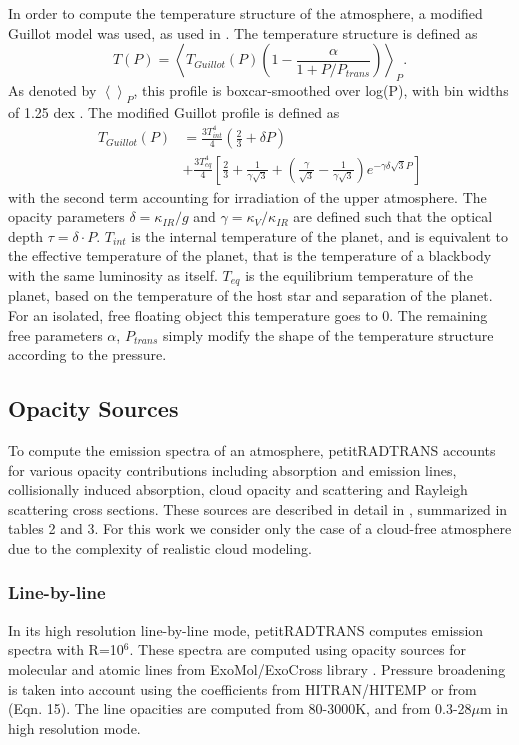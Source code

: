 In order to compute the temperature structure of the atmosphere, a modified Guillot model \parencite{Guillot2010} was used, as used in \parencite{Molliere2017,Molliere2019}.
The temperature structure is defined as 
\begin{equation}
T(P) = \left<T_{Guillot}(P)\left(1-\frac{\alpha}{1+P/P_{trans}}\right)\right>_{P}.
\end{equation}
As denoted by $\left<\right>_{P}$, this profile is boxcar-smoothed over log(P), with bin widths of 1.25 dex \parencite{Molliere2019}. 
The modified Guillot profile is defined as
\begin{align}
T_{Guillot}(P) &= \frac{3T^{4}_{int}}{4}\left(\frac{2}{3} + \delta P\right)\\
&+\frac{3T^{4}_{eq}}{4}\left[\frac{2}{3} + \frac{1}{\gamma\sqrt{3}} + \left(\frac{\gamma}{\sqrt{3}} - \frac{1}{\gamma\sqrt{3}}\right)e^{-\gamma\delta\sqrt{3}P}\right]
\end{align}
with the second term accounting for irradiation of the upper atmosphere.
The opacity parameters $\delta=\kappa_{IR}/g$ and  $\gamma=\kappa_{V}/\kappa_{IR}$ are defined such that the optical depth $\tau=\delta\cdot P$. 
$T_{int}$ is the internal temperature of the planet, and is equivalent to the effective temperature of the planet, that is the temperature of a blackbody with the same luminosity as itself.
$T_{eq}$ is the equilibrium temperature of the planet, based on the temperature of the host star and separation of the planet. 
For an isolated, free floating object this temperature goes to 0.
The remaining free parameters $\alpha$, $P_{trans}$ simply modify the shape of the temperature structure according to the pressure.

\subsection{Opacity Sources}
To compute the emission spectra of an atmosphere, petitRADTRANS accounts for various opacity contributions including absorption and emission lines, collisionally induced absorption, cloud opacity and scattering and Rayleigh scattering cross sections. These sources are described in detail in \parencite{Molliere2019}, summarized in tables 2 and 3. For this work we consider only the case of a cloud-free atmosphere due to the complexity of realistic cloud modeling.
\subsubsection{Line-by-line}
In its high resolution line-by-line mode, petitRADTRANS computes emission spectra with R=10$^{6}$. 
These spectra are computed using opacity sources for molecular and atomic lines from ExoMol/ExoCross library \parencite{Yurchenko2018}. Pressure broadening is taken into account using the coefficients from HITRAN/HITEMP \parencite{Rothman2010,Rothman2013} or from \parencite{Sharp2007} (Eqn. 15). The line opacities are computed from 80-3000K, and from 0.3-28$\mu$m in high resolution mode.
